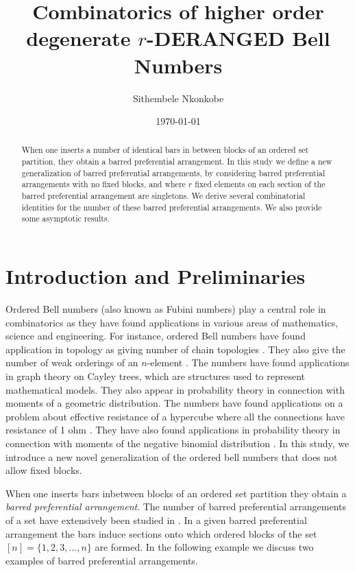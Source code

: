 \documentclass[12pt]{amsart}
\title[]{Combinatorics of higher order degenerate  $r$-DERANGED Bell Numbers}
\author{Sithembele Nkonkobe}
\date{\today}
\newtheorem{proof 1}{proof 1}
\begin{document}
	\begin{abstract} When one inserts a number of identical bars in between blocks of an ordered set partition, they obtain a barred preferential arrangement. In this study we define a new generalization of barred preferential arrangements, by considering barred preferential arrangements with no fixed blocks, and where $r$ fixed elements on each section of the barred preferential arrangement are singletons. We derive several combinatorial identities for the number of these barred preferential arrangements. We also provide some asymptotic results.
	   
	\end{abstract}
	\maketitle
	
	\section{Introduction and Preliminaries}
	
Ordered Bell numbers (also known as Fubini numbers) play a central role in combinatorics as they have found applications in various areas of mathematics, science and engineering. For instance, ordered Bell numbers have found application in topology as giving number of chain topologies \cite{stanley1971number}. They also give the number of weak orderings of an $n$-element \cite{bailey1998number}. The numbers have found applications in graph theory on Cayley trees, which are structures used to represent mathematical models\cite{cayley1875analytical}. They also appear in probability theory in connection with moments of a geometric distribution\cite{simsek2025analysis}. The numbers have found applications on a problem about effective resistance of a hypercube where all the connections have resistance of 1 ohm \cite{pippenger2010hypercube}. They have also found applications in probability theory in connection with moments of the negative binomial distribution \cite{adell2023generalized}. In this study, we introduce a new novel generalization of the ordered bell numbers that does not allow fixed blocks. 

  When one inserts bars inbetween blocks of an ordered set partition they obtain a \textit{barred preferential arrangement}. The number of barred preferential arrangements of a set have extensively been studied in \cite{adell2023generalized,JoseNkonkobeunified,adell2023higher,benyi2024combinatorial,corcino2020second,nkonkobe2020combinatorial,nkonkobe2017study}. In a given barred preferential arrangement the bars induce sections onto which ordered blocks of the set $[n]=\{1,2,3,\ldots,n\}$ are formed. In the following example we discuss two examples of barred preferential arrangements.
		
\end{document}
